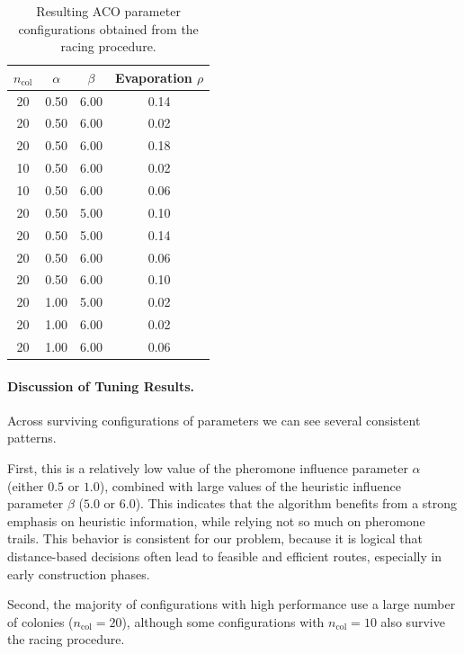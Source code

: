 \documentclass[12pt]{article}
\begin{document}
\begin{table}[H]
    \centering
    \caption{Resulting ACO parameter configurations obtained from the racing procedure.}
    \begin{tabular}{cccc}
        \toprule
        \textbf{$n_{\text{col}}$} & \textbf{$\alpha$} & \textbf{$\beta$} & \textbf{Evaporation $\rho$} \\
        \midrule
        20 & 0.50 & 6.00 & 0.14 \\
        20 & 0.50 & 6.00 & 0.02 \\
        20 & 0.50 & 6.00 & 0.18 \\
        10 & 0.50 & 6.00 & 0.02 \\
        10 & 0.50 & 6.00 & 0.06 \\
        20 & 0.50 & 5.00 & 0.10 \\
        20 & 0.50 & 5.00 & 0.14 \\
        20 & 0.50 & 6.00 & 0.06 \\
        20 & 0.50 & 6.00 & 0.10 \\
        20 & 1.00 & 5.00 & 0.02 \\
        20 & 1.00 & 6.00 & 0.02 \\
        20 & 1.00 & 6.00 & 0.06 \\
        \bottomrule
    \end{tabular}
    \label{tab:aco_parameters}
\end{table}


\paragraph{Discussion of Tuning Results.}
Across surviving configurations of parameters we can see several consistent patterns.

First, this is a relatively low value of the pheromone influence parameter $\alpha$ (either $0.5$ or $1.0$), combined with large values of the heuristic influence parameter $\beta$ ($5.0$ or $6.0$).
This indicates that the algorithm benefits from a strong emphasis on heuristic information, while relying not so much on pheromone trails. This behavior is consistent for our problem, because it is logical that distance-based decisions often lead to feasible and efficient routes, especially in early construction phases.

Second, the majority of configurations with high performance use a large number of colonies ($n_{\text{col}} = 20$), although some configurations with $n_{\text{col}} = 10$ also survive the racing procedure.
\end{document}
